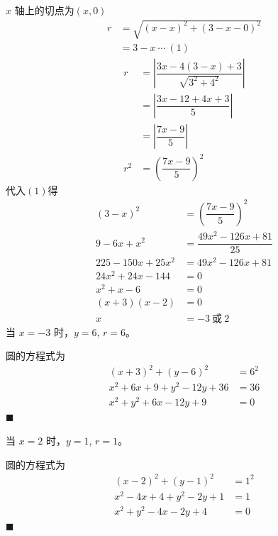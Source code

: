\documentclass[10pt]{article}
\begin{document}
\begin{enumerate}[leftmargin=*]
        $x$ 轴上的切点为$(x, 0)$
        \begin{align*}
          r & = \sqrt{(x - x)^{2} + (3 - x - 0)^{2}} \\
            & = 3 - x\ \cdots\ (1)
        \end{align*}
        \begin{align*}
          r   & = \left\vert \dfrac{3x - 4(3 - x) + 3}{\sqrt{3^{2} + 4^{2}}} \right\vert \\
              & = \left\vert \dfrac{3x - 12 + 4x + 3}{5} \right\vert                     \\
              & = \left\vert \dfrac{7x - 9}{5} \right\vert                               \\
          r^2 & = \left(\dfrac{7x - 9}{5}\right)^{2}
        \end{align*}
        代入$(1)$得
        \begin{align*}
          (3 - x)^{2}          & = \left(\dfrac{7x - 9}{5}\right)^{2} \\
          9 - 6x + x^{2}       & = \dfrac{49x^{2} - 126x + 81}{25}    \\
          225 - 150x + 25x^{2} & = 49x^{2} - 126x + 81                \\
          24x^{2} + 24x - 144  & = 0                                  \\
          x^{2} + x - 6        & = 0                                  \\
          (x + 3)(x - 2)       & = 0                                  \\
          x                    & = -3\ \text{或}\ 2
        \end{align*}
        当 $x = -3$ 时，$y = 6$, $r = 6$。

        圆的方程式为
        \begin{align*}
          (x + 3)^{2} + (y - 6)^{2}     & = 6^{2} \\
          x^2 + 6x + 9 + y^2 - 12y + 36 & = 36    \\
          x^2 + y^2 + 6x - 12y + 9      & = 0
        \end{align*} \hfill$\blacksquare$

        当 $x = 2$ 时，$y = 1$, $r = 1$。

        圆的方程式为
        \begin{align*}
          (x - 2)^{2} + (y - 1)^{2}   & = 1^{2} \\
          x^2 - 4x + 4 + y^2 - 2y + 1 & = 1     \\
          x^2 + y^2 - 4x - 2y + 4     & = 0
        \end{align*} \hfill$\blacksquare$


\end{enumerate}
\end{document}
